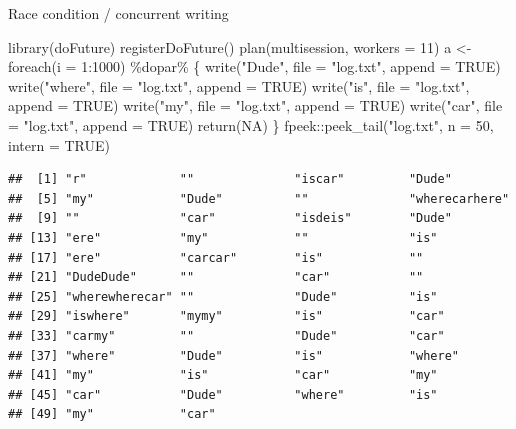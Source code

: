 \documentclass[
  ignorenonframetext,
  usenames,
  dvipsnames]{beamer}
\newenvironment{Shaded}{\begin{snugshade}}{\end{snugshade}}
\newcommand{\AttributeTok}[1]{\textcolor[rgb]{0.77,0.63,0.00}{#1}}
\newcommand{\ConstantTok}[1]{\textcolor[rgb]{0.00,0.00,0.00}{#1}}
\newcommand{\DecValTok}[1]{\textcolor[rgb]{0.00,0.00,0.81}{#1}}
\newcommand{\FunctionTok}[1]{\textcolor[rgb]{0.00,0.00,0.00}{#1}}
\newcommand{\NormalTok}[1]{#1}
\newcommand{\OtherTok}[1]{\textcolor[rgb]{0.56,0.35,0.01}{#1}}
\newcommand{\SpecialCharTok}[1]{\textcolor[rgb]{0.00,0.00,0.00}{#1}}
\newcommand{\StringTok}[1]{\textcolor[rgb]{0.31,0.60,0.02}{#1}}
\begin{document}
\begin{frame}[fragile]{Race condition / concurrent writing}
\protect\hypertarget{race-condition-concurrent-writing}{}
\tiny

\begin{Shaded}
\begin{Highlighting}[]
\FunctionTok{library}\NormalTok{(doFuture)}
\FunctionTok{registerDoFuture}\NormalTok{()}
\FunctionTok{plan}\NormalTok{(multisession, }\AttributeTok{workers =} \DecValTok{11}\NormalTok{)}
\NormalTok{a }\OtherTok{\textless{}{-}} \FunctionTok{foreach}\NormalTok{(}\AttributeTok{i =} \DecValTok{1}\SpecialCharTok{:}\DecValTok{1000}\NormalTok{) }\SpecialCharTok{\%dopar\%}\NormalTok{ \{}
  \FunctionTok{write}\NormalTok{(}\StringTok{"Dude"}\NormalTok{, }\AttributeTok{file =} \StringTok{"log.txt"}\NormalTok{, }\AttributeTok{append =} \ConstantTok{TRUE}\NormalTok{)}
  \FunctionTok{write}\NormalTok{(}\StringTok{"where"}\NormalTok{, }\AttributeTok{file =} \StringTok{"log.txt"}\NormalTok{, }\AttributeTok{append =} \ConstantTok{TRUE}\NormalTok{)}
  \FunctionTok{write}\NormalTok{(}\StringTok{"is"}\NormalTok{, }\AttributeTok{file =} \StringTok{"log.txt"}\NormalTok{, }\AttributeTok{append =} \ConstantTok{TRUE}\NormalTok{)}
  \FunctionTok{write}\NormalTok{(}\StringTok{"my"}\NormalTok{, }\AttributeTok{file =} \StringTok{"log.txt"}\NormalTok{, }\AttributeTok{append =} \ConstantTok{TRUE}\NormalTok{)}
  \FunctionTok{write}\NormalTok{(}\StringTok{"car"}\NormalTok{, }\AttributeTok{file =} \StringTok{"log.txt"}\NormalTok{, }\AttributeTok{append =} \ConstantTok{TRUE}\NormalTok{)}
  \FunctionTok{return}\NormalTok{(}\ConstantTok{NA}\NormalTok{)}
\NormalTok{\}}
\NormalTok{fpeek}\SpecialCharTok{::}\FunctionTok{peek\_tail}\NormalTok{(}\StringTok{"log.txt"}\NormalTok{, }\AttributeTok{n =} \DecValTok{50}\NormalTok{, }\AttributeTok{intern =} \ConstantTok{TRUE}\NormalTok{)}
\end{Highlighting}
\end{Shaded}

\begin{verbatim}
##  [1] "r"             ""              "iscar"         "Dude"         
##  [5] "my"            "Dude"          ""              "wherecarhere" 
##  [9] ""              "car"           "isdeis"        "Dude"         
## [13] "ere"           "my"            ""              "is"           
## [17] "ere"           "carcar"        "is"            ""             
## [21] "DudeDude"      ""              "car"           ""             
## [25] "wherewherecar" ""              "Dude"          "is"           
## [29] "iswhere"       "mymy"          "is"            "car"          
## [33] "carmy"         ""              "Dude"          "car"          
## [37] "where"         "Dude"          "is"            "where"        
## [41] "my"            "is"            "car"           "my"           
## [45] "car"           "Dude"          "where"         "is"           
## [49] "my"            "car"
\end{verbatim}

\normalsize
\end{frame}
\end{document}
